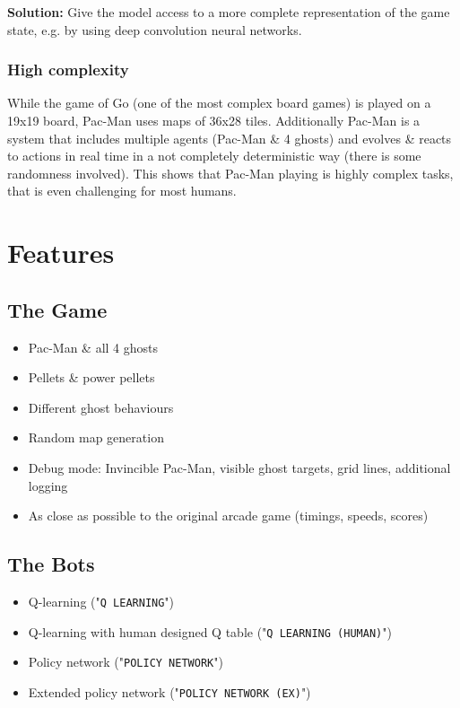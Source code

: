 \documentclass[10pt, letterpaper]{article}
\begin{document}
            \vspace{1em}\noindent
            \textbf{Solution:} Give the model access to a more complete representation of the game state, e.g. by using deep convolution neural networks.
            
        \subsubsection*{High complexity}
            While the game of Go (one of the most complex board games) is played on a 19x19 board, Pac-Man uses maps of 36x28 tiles. Additionally Pac-Man is a system that includes multiple agents (Pac-Man \& 4 ghosts) and evolves \& reacts to actions in real time in a not completely deterministic way (there is some randomness involved). This shows that Pac-Man playing is highly complex tasks, that is even challenging for most humans.

    \section{Features}
        \subsection{The Game}
            \begin{itemize}
                \item Pac-Man \& all 4 ghosts
                \item Pellets \& power pellets
                \item Different ghost behaviours
                \item Random map generation
                \item Debug mode: Invincible Pac-Man, visible ghost targets, grid lines, additional logging
                \item As close as possible to the original arcade game (timings, speeds, scores)
            \end{itemize}
            
        \subsection{The Bots}
            \begin{itemize}
                \item Q-learning ("\texttt{Q LEARNING}")
                \item Q-learning with human designed Q table ("\texttt{Q LEARNING (HUMAN)}")
                \item Policy network ("\texttt{POLICY NETWORK}")
                \item Extended policy network ("\texttt{POLICY NETWORK (EX)}")
            \end{itemize}
            
\end{document}
